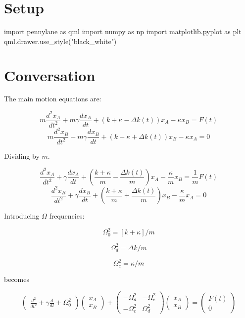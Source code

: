 \section{Setup}


\begin{python}
import pennylane as qml
import numpy as np
import matplotlib.pyplot as plt
qml.drawer.use_style("black_white")
\end{python}

\begin{result}
\end{result}

\newpage
\section{Conversation}

The main motion equations are:

\[
  m \frac{d^2x_A}{dt^2} + m \gamma \frac{dx_A}{dt} + \left(k + \kappa - \Delta
k(t)\right)x_A
  - \kappa x_B = F(t)
\]
\[
  m \frac{d^2x_B}{dt^2} + m \gamma \frac{dx_B}{dt} + \left(k + \kappa + \Delta
k(t)\right)x_B
  - \kappa x_A = 0
\]

Dividing by $m$.

\[
  \frac{d^2x_A}{dt^2} + \gamma \frac{dx_A}{dt} + \left(\frac{k + \kappa}{m} - \frac{\Delta
    k(t)}{m}\right)x_A -\frac{\kappa}{m}x_B = \frac{1}{m}F(t)
\]
\[
  \frac{d^2x_B}{dt^2} + \gamma \frac{dx_B}{dt} + \left(\frac{k + \kappa}{m} + \frac{\Delta
    k(t)}{m}\right)x_B -\frac{\kappa}{m}x_A = 0
\]

Introducing $\Omega$ frequencies:

\[
  \Omega_0^2 = [k + \kappa]/m
\]

\[
  \Omega_d^2 = \Delta k / m
\]

\[
  \Omega_c^2 = \kappa / m
\]

becomes

\[
\begin{pmatrix}
  \frac{d^2}{dt^2} + \gamma \frac{d}{dt} + \Omega_0^2
\end{pmatrix}
\begin{pmatrix}
 x_A \\
 x_B
\end{pmatrix}
+
\begin{pmatrix}
  -\Omega_d^2 & -\Omega_c^2 \\ -\Omega_c^2 & \Omega_d^2
\end{pmatrix}
\begin{pmatrix}
 x_A \\
 x_B
\end{pmatrix}
=
\begin{pmatrix}
 F(t) \\
 0
\end{pmatrix}
\]


